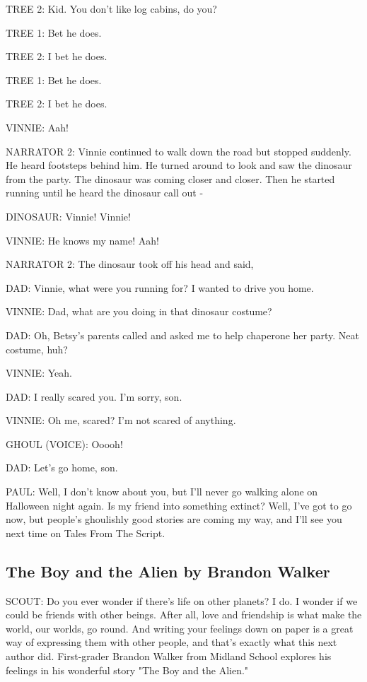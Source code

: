 TREE 2:
Kid.
You don't like log cabins, do you?

TREE 1:
Bet he does.

TREE 2:
I bet he does.

TREE 1:
Bet he does.

TREE 2:
I bet he does.

VINNIE:
Aah!

NARRATOR 2:
Vinnie continued to walk down the road but stopped suddenly.
He heard footsteps behind him.
He turned around to look and saw the dinosaur from the party.
The dinosaur was coming closer and closer.
Then he started running until he heard the dinosaur call out -

DINOSAUR:
Vinnie! Vinnie!

VINNIE:
He knows my name!
Aah!

NARRATOR 2:
The dinosaur took off his head and said,

DAD:
Vinnie, what were you running for?
I wanted to drive you home.

VINNIE:
Dad, what are you doing in that dinosaur costume?

DAD:
Oh, Betsy's parents called and asked me to help chaperone her party.
Neat costume, huh?

VINNIE:
Yeah.

DAD:
I really scared you.
I'm sorry, son.

VINNIE:
Oh me, scared? I'm not scared of anything.

GHOUL (VOICE):
Ooooh!

DAD:
Let's go home, son.

PAUL:
Well, I don't know about you, but I'll never go walking alone on Halloween night again.
Is my friend into something extinct?
Well, I've got to go now, but people's ghoulishly good stories are coming my way, and I'll see you next time on Tales From The Script.

\subsection{The Boy and the Alien by Brandon Walker}

SCOUT:
Do you ever wonder if there's life on other planets?
I do.
I wonder if we could be friends with other beings.
After all, love and friendship is what make the world, our worlds, go round.
And writing your feelings down on paper is a great way of expressing them with other people, and that's exactly what this next author did.
First-grader Brandon Walker from Midland School explores his feelings in his wonderful story "The Boy and the Alien."

